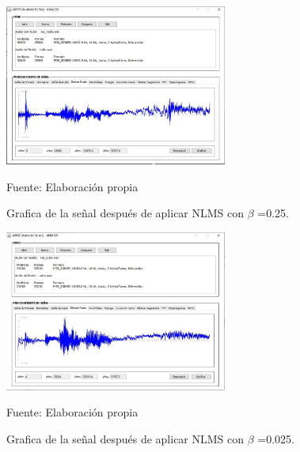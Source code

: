 \begin{figure}[H]
\begin{center}
\includegraphics[width=0.65\textwidth]{Imagenes/Cap3/image081}
\end{center}
\begin{center}
\vskip -0.5cm
\caption{\small{Grafica de la señal después de aplicar NLMS con $\beta$ =0.25.}}
\label{fig:figura3.81}
{\small{Fuente: Elaboración propia}}
\end{center}
\end{figure}

\vskip -1cm

\begin{figure}[H]
\begin{center}
\includegraphics[width=0.65\textwidth]{Imagenes/Cap3/image082}
\end{center}
\begin{center}
\vskip -0.5cm
\caption{\small{Grafica de la señal después de aplicar NLMS con $\beta$ =0.025.}}
\label{fig:figura3.82}
{\small{Fuente: Elaboración propia}}
\end{center}
\end{figure}


